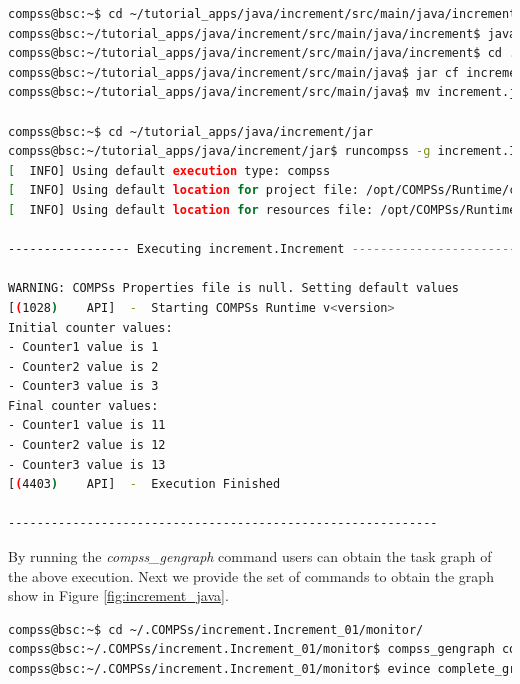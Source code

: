 \begin{lstlisting}[language=bash]
compss@bsc:~$ cd ~/tutorial_apps/java/increment/src/main/java/increment/
compss@bsc:~/tutorial_apps/java/increment/src/main/java/increment$ javac *.java
compss@bsc:~/tutorial_apps/java/increment/src/main/java/increment$ cd ..
compss@bsc:~/tutorial_apps/java/increment/src/main/java$ jar cf increment.jar increment
compss@bsc:~/tutorial_apps/java/increment/src/main/java$ mv increment.jar ~/tutorial_apps/java/increment/jar/

compss@bsc:~$ cd ~/tutorial_apps/java/increment/jar
compss@bsc:~/tutorial_apps/java/increment/jar$ runcompss -g increment.Increment 10 1 2 3
[  INFO] Using default execution type: compss
[  INFO] Using default location for project file: /opt/COMPSs/Runtime/configuration/xml/projects/default_project.xml
[  INFO] Using default location for resources file: /opt/COMPSs/Runtime/configuration/xml/resources/default_resources.xml

----------------- Executing increment.Increment --------------------------

WARNING: COMPSs Properties file is null. Setting default values
[(1028)    API]  -  Starting COMPSs Runtime v<version>
Initial counter values:
- Counter1 value is 1
- Counter2 value is 2
- Counter3 value is 3
Final counter values:
- Counter1 value is 11
- Counter2 value is 12
- Counter3 value is 13
[(4403)    API]  -  Execution Finished

------------------------------------------------------------
\end{lstlisting}

By running the \textit{compss\_gengraph} command users can obtain the task graph of the above execution. Next we provide the set of commands to obtain the
graph show in Figure \ref{fig:increment_java}.

\begin{lstlisting}[language=bash]
compss@bsc:~$ cd ~/.COMPSs/increment.Increment_01/monitor/
compss@bsc:~/.COMPSs/increment.Increment_01/monitor$ compss_gengraph complete_graph.dot
compss@bsc:~/.COMPSs/increment.Increment_01/monitor$ evince complete_graph.pdf
\end{lstlisting}

